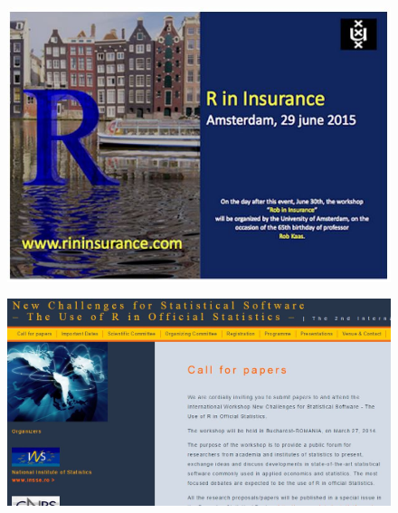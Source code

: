 \documentclass{beamer}
\begin{document}
\begin{frame}
	\begin{figure}
		\centering
		\includegraphics[width=1.11\linewidth]{rininsurance}
		
	\end{figure}
	
\end{frame}
\begin{frame}
	\begin{figure}
		\centering
		\includegraphics[width=1.11\linewidth]{rofficialstats}
		
	\end{figure}
	
\end{frame}
\end{document}
